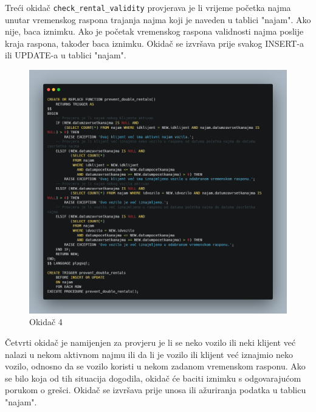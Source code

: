 \documentclass[]{foi} %
\begin{document}
Treći okidač \texttt{check\_rental\_validity} provjerava je li vrijeme početka najma unutar vremenskog raspona trajanja najma koji je naveden u tablici "najam". Ako nije, baca iznimku. Ako je početak vremenskog raspona validnosti najma poslije kraja raspona, također baca iznimku. Okidač se izvršava prije svakog INSERT-a ili UPDATE-a u tablici "najam".
\newpage

\begin{figure}[!ht]
    \centering
    \includegraphics[width=1\textwidth]{slike/4.png}
    \caption{Okidač 4}
    \label{fig:cetvrti}
\end{figure}

Četvrti okidač je namijenjen za provjeru je li se neko vozilo ili neki klijent već nalazi u nekom aktivnom najmu ili da li je vozilo ili klijent već iznajmio neko vozilo, odnosno da se vozilo koristi u nekom zadanom vremenskom rasponu. Ako se bilo koja od tih situacija dogodila, okidač će baciti iznimku s odgovarajućom porukom o grešci. Okidač se izvršava prije unosa ili ažuriranja podatka u tablicu "najam".
\newpage
\end{document}
